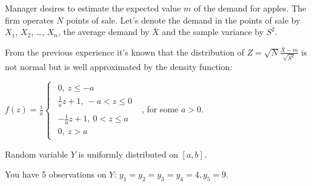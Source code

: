 \documentclass[addpoints]{exam} %
\begin{document}
\begin{questions}
\question Manager desires to estimate the expected value $m$ of the demand for apples. The firm operates $N$ points of sale. Let's denote the demand in the points of sale by $X_1$, $X_2$, \ldots, $X_n$, the average demand by $\bar X$ and the sample variance by $S^2$.

From the previous experience it's known that the distribution of  $Z=\sqrt{N}\frac{\overline{X}-m}{\sqrt{S^2}}$ is not normal but is well approximated by the density function:

$f\left(z\right)=\frac{1}{a}\left\{ \begin{array}{c}
 \begin{array}{c}
0,\ z\le -a \\
\frac{1}{a}z+1,\ -a<z\le 0 \end{array}
 \\
 \begin{array}{c}
-\frac{1}{a}z+1,\ 0<z\le a \\
0,\ z>a \end{array}
 \end{array}
\right.$ , for some $a>0$.





\question Random variable $Y$ is uniformly distributed on $[a,b]$.

You have 5 observations on $Y$: $y_1 = y_2 = y_3 = y_4 = 4, y_5 = 9$.

\end{questions}
\end{document}
